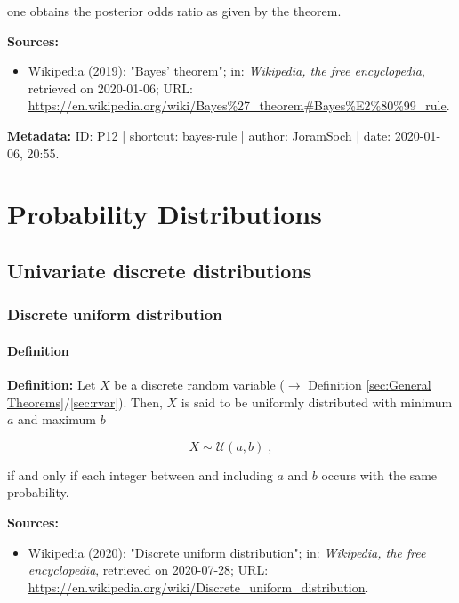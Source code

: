 \documentclass[a4paper,12pt,twoside]{book}
\begin{document}
one obtains the posterior odds ratio as given by the theorem.


\vspace{1em}
\textbf{Sources:}
\begin{itemize}
\item Wikipedia (2019): "Bayes' theorem"; in: \textit{Wikipedia, the free encyclopedia}, retrieved on 2020-01-06; URL: \url{https://en.wikipedia.org/wiki/Bayes%27_theorem#Bayes%E2%80%99_rule}.
\end{itemize}


\vspace{1em}
\textbf{Metadata:} ID: P12 | shortcut: bayes-rule | author: JoramSoch | date: 2020-01-06, 20:55.
\vspace{1em}





\chapter{Probability Distributions} \label{sec:Probability Distributions} \newpage

\pagebreak
\section{Univariate discrete distributions}

\subsection{Discrete uniform distribution}

\subsubsection[\textit{Definition}]{Definition} \label{sec:duni}
\setcounter{equation}{0}

\textbf{Definition:} Let $X$ be a discrete random variable ($\rightarrow$ Definition \ref{sec:General Theorems}/\ref{sec:rvar}). Then, $X$ is said to be uniformly distributed with minimum $a$ and maximum $b$

\begin{equation} \label{eq:duni-duni}
X \sim \mathcal{U}(a, b) \; ,
\end{equation}

if and only if each integer between and including $a$ and $b$ occurs with the same probability.


\vspace{1em}
\textbf{Sources:}
\begin{itemize}
\item Wikipedia (2020): "Discrete uniform distribution"; in: \textit{Wikipedia, the free encyclopedia}, retrieved on 2020-07-28; URL: \url{https://en.wikipedia.org/wiki/Discrete_uniform_distribution}.
\end{itemize}
\end{document}
